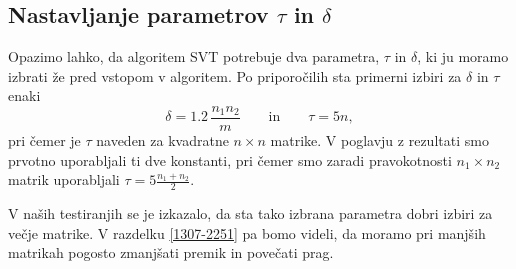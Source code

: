 \subsection{Nastavljanje parametrov $\tau$ in $\delta$} \label{1907-1648}
Opazimo lahko, da algoritem SVT potrebuje dva parametra, $\tau$ in $\delta$, ki ju moramo izbrati 
že pred vstopom v algoritem.
Po priporočilih \cite{CCS}
sta primerni izbiri za $\delta$ in $\tau$
enaki 
\[
    \delta = 1.2\, \dfrac{n_1 n_2}{m}\qquad\text{in}\qquad
    \tau = 5n,
\]
pri čemer je $\tau$ naveden za kvadratne $n\times n$ matrike.
V poglavju z rezultati smo prvotno uporabljali ti dve konstanti, pri 
čemer smo zaradi
pravokotnosti $n_1\times n_2$ matrik uporabljali
$\tau = 5\frac{n_1+n_2}{2}$.
\iffalse
Medtem, ko so koraki v samem algoritmu definirani kot množica korakov, 
smo v okviru rezultatov diplomske naloge, prvotno za premik uporabljali konstanto, ter korak nastavili na 
 po priporočilih \cite{CCS}. 
 \fi
\iffalse
Prav tako članek \cite{CCS} navaja, da je za matrike velikosti $\mathbb{R}^{n \times n}$ smiselno nastaviti $\tau = 5n$, vendar sem v moji implementaciji zaradi posploševanja na nekvadratne matrike, za matrike velikosti $\mathbb{R}^{n_1 \times n_2}$ parameter nastavil na
\[
    \tau = 5\, \frac{n_1+n_2}{2}
\]
\fi
V naših testiranjih se je izkazalo, da sta tako izbrana parametra dobri izbiri za večje matrike. V razdelku \ref{1307-2251} pa bomo videli, da moramo pri manjših matrikah pogosto zmanjšati premik in povečati prag.